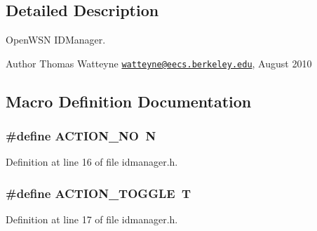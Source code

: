 \subsection{Detailed Description}
Open\+W\+SN I\+D\+Manager. 

\begin{DoxyAuthor}{Author}
Thomas Watteyne \href{mailto:watteyne@eecs.berkeley.edu}{\tt watteyne@eecs.\+berkeley.\+edu}, August 2010 
\end{DoxyAuthor}


\subsection{Macro Definition Documentation}
\subsubsection[{\texorpdfstring{A\+C\+T\+I\+O\+N\+\_\+\+NO}{ACTION_NO}}]{\setlength{\rightskip}{0pt plus 5cm}\#define A\+C\+T\+I\+O\+N\+\_\+\+NO~\textquotesingle{}N\textquotesingle{}}\hypertarget{group___i_d_manager_ga7a8c6698e6d3bf6fb3528ba07aa8d5eb}{}\label{group___i_d_manager_ga7a8c6698e6d3bf6fb3528ba07aa8d5eb}


Definition at line 16 of file idmanager.\+h.

\subsubsection[{\texorpdfstring{A\+C\+T\+I\+O\+N\+\_\+\+T\+O\+G\+G\+LE}{ACTION_TOGGLE}}]{\setlength{\rightskip}{0pt plus 5cm}\#define A\+C\+T\+I\+O\+N\+\_\+\+T\+O\+G\+G\+LE~\textquotesingle{}T\textquotesingle{}}\hypertarget{group___i_d_manager_ga935e9aef6a097c624a9b3b6147fbf197}{}\label{group___i_d_manager_ga935e9aef6a097c624a9b3b6147fbf197}


Definition at line 17 of file idmanager.\+h.

